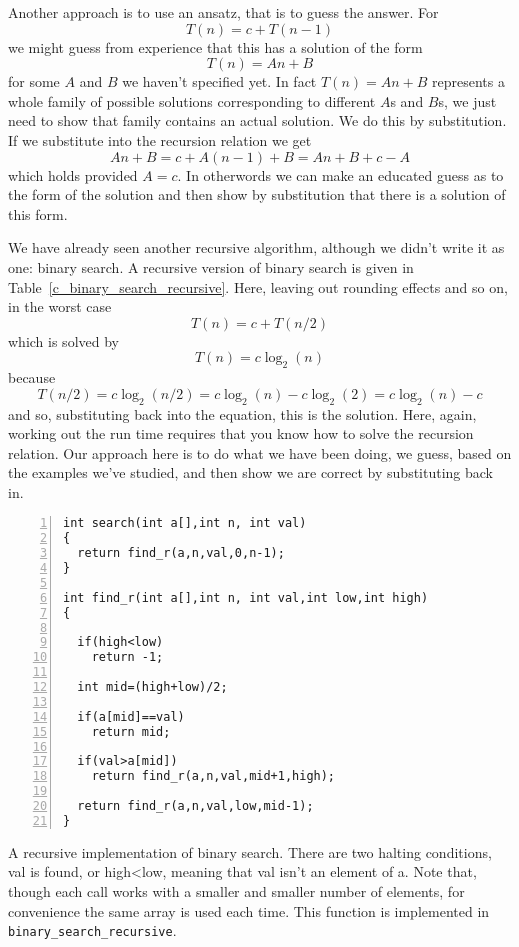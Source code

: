 \documentclass[11pt,a4paper]{scrartcl}
\begin{document}
Another approach is to use an ansatz, that is to guess the answer. For
\begin{equation}
T(n)=c+T(n-1)
\end{equation}
we might guess from experience that this has a solution of the form
\begin{equation}
T(n)=An+B
\end{equation}
for some $A$ and $B$ we haven't specified yet. In fact $T(n)=An+B$
represents a whole family of possible solutions corresponding to different $A$s
and $B$s, we just need to show that family contains an actual solution. We do this by substitution. If we substitute into the recursion relation we get
\begin{equation}
An+B=c+A(n-1)+B=An+B+c-A
\end{equation}
which holds provided $A=c$. In otherwords we can make an educated
guess as to the form of the solution and then show by substitution
that there is a solution of this form.

We have already seen another recursive algorithm, although we didn't
write it as one: binary search. A recursive version of binary search is
given in Table~\ref{c_binary_search_recursive}. Here, leaving out
rounding effects and so on, in the worst case
\begin{equation}
T(n)=c+T(n/2)
\end{equation}
which is solved by 
\begin{equation}
T(n)=c\log_2(n)
\end{equation}
because 
\begin{equation}
T(n/2)=c\log_2(n/2)=c\log_2(n)-c\log_2(2)=c\log_2(n)-c
\end{equation}
and so, substituting back into the equation, this is the solution.
Here, again, working out the run time requires that you know how to
solve the recursion relation. Our approach here is to do what we have
been doing, we guess, based on the examples we've studied, and then
show we are correct by substituting back in.

\begin{table}
\begin{lstlisting}[numbers=left]
int search(int a[],int n, int val)
{
  return find_r(a,n,val,0,n-1);
}
 
int find_r(int a[],int n, int val,int low,int high)
{

  if(high<low)
    return -1;

  int mid=(high+low)/2;

  if(a[mid]==val)
    return mid;

  if(val>a[mid])
    return find_r(a,n,val,mid+1,high);
  
  return find_r(a,n,val,low,mid-1);
}
\end{lstlisting}
\caption{A recursive implementation of binary search. There are two
  halting conditions, val is found, or high<low, meaning that val
  isn't an element of a. Note that, though each call works with a
  smaller and smaller number of elements, for convenience the same
  array is used each time. This function is implemented in {\tt
    binary\_search\_recursive}.\label{c_binary_search_recursive}}
\end{table}
\end{document}
